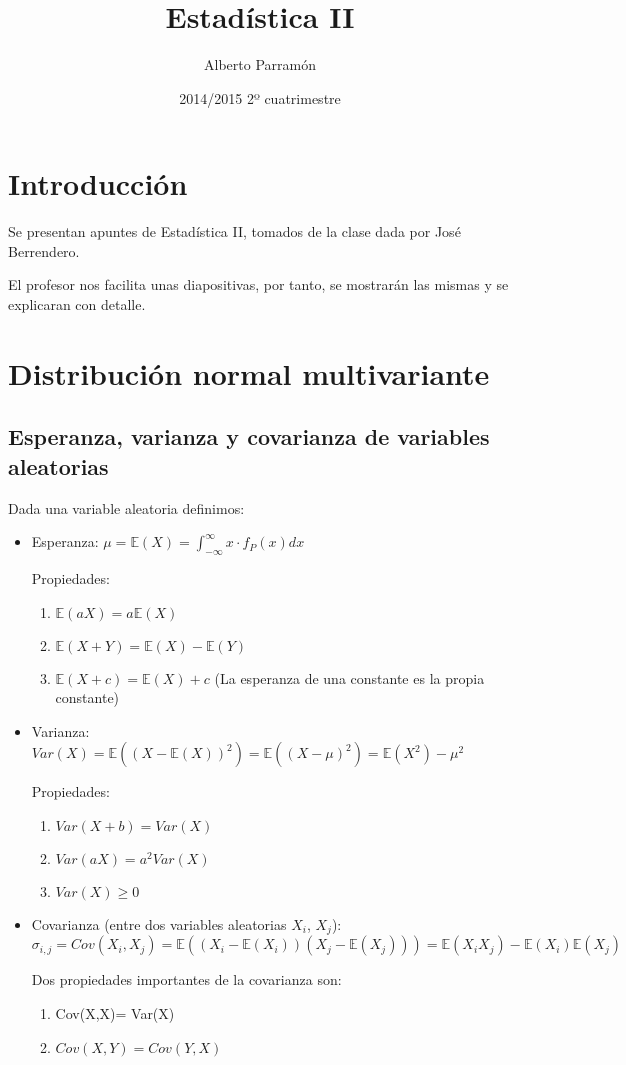 \documentclass[nochap]{apuntes}
\author{Alberto Parramón}
\date{2014/2015 2º cuatrimestre}
\title{Estadística II}
\begin{document}
\pagestyle{plain}
\maketitle

\tableofcontents
\newpage

\section{Introducción}
Se presentan apuntes de Estadística II, tomados de la clase dada por José Berrendero.

El profesor nos facilita unas diapositivas, por tanto, se mostrarán las mismas y se explicaran con detalle.

\section{Distribución normal multivariante}



\subsection{Esperanza, varianza y covarianza de variables aleatorias}
Dada una variable aleatoria definimos:
\begin{itemize}
\item Esperanza: $\mu = \mathbb{E}(X) = \int_{-\infty}^{\infty}x\cdot f_P(x) dx$

Propiedades:
\begin{enumerate}
\item $\mathbb{E}(aX) = a\mathbb{E}(X)$
\item $\mathbb{E}(X+Y) = \mathbb{E}(X)-\mathbb{E}(Y)$
\item $\mathbb{E}(X+c) = \mathbb{E}(X)+c$ (La esperanza de una constante es la propia constante)
\end{enumerate}
\item Varianza: $Var(X) = \mathbb{E}((X-\mathbb{E}(X))^2) =\mathbb{E}((X-\mu)^2) = \mathbb{E}(X^2)-\mu^2$

Propiedades:
\begin{enumerate}
\item $Var(X+b)=Var(X)$
\item $Var(aX)=a^2Var(X)$
\item $Var(X)\geq 0$
\end{enumerate}
\item Covarianza (entre dos variables aleatorias $X_i$, $X_j$): $\sigma_{i,j} = Cov(X_i,X_j) = \mathbb{E}\left((X_i-\mathbb{E}(X_i))(X_j-\mathbb{E}(X_j))\right) = \mathbb{E}(X_i X_j)-\mathbb{E}(X_i)\mathbb{E}(X_j)$

Dos propiedades importantes de la covarianza son:

\begin{enumerate}
\item Cov(X,X)= Var(X)
\item $Cov(X,Y)=Cov(Y,X)$
\end{enumerate}

\end{itemize}
\end{document}
